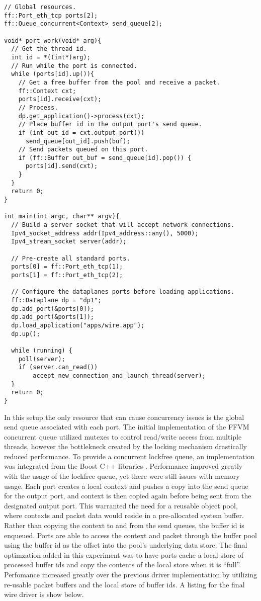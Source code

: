 \begin{lstlisting}
// Global resources.
ff::Port_eth_tcp ports[2];
ff::Queue_concurrent<Context> send_queue[2];

void* port_work(void* arg){
  // Get the thread id.
  int id = *((int*)arg);
  // Run while the port is connected.
  while (ports[id].up()){
    // Get a free buffer from the pool and receive a packet.
    ff::Context cxt;
    ports[id].receive(cxt);
    // Process.
    dp.get_application()->process(cxt);
    // Place buffer id in the output port's send queue.
    if (int out_id = cxt.output_port())
      send_queue[out_id].push(buf);
    // Send packets queued on this port.
    if (ff::Buffer out_buf = send_queue[id].pop()) {
      ports[id].send(cxt);
    }
  }
  return 0;
}

int main(int argc, char** argv){
  // Build a server socket that will accept network connections.
  Ipv4_socket_address addr(Ipv4_address::any(), 5000);
  Ipv4_stream_socket server(addr);

  // Pre-create all standard ports.
  ports[0] = ff::Port_eth_tcp(1);
  ports[1] = ff::Port_eth_tcp(2);

  // Configure the dataplanes ports before loading applications.
  ff::Dataplane dp = "dp1";
  dp.add_port(&ports[0]);
  dp.add_port(&ports[1]);
  dp.load_application("apps/wire.app");
  dp.up();

  while (running) {
  	poll(server);
  	if (server.can_read())
  		accept_new_connection_and_launch_thread(server);
  }
  return 0;
}
\end{lstlisting}

In this setup the only resource that can cause concurrency issues is the global
send queue associated with each port. The initial implementation of the FFVM
concurrent queue utilized mutexes to control read/write access from multiple
threads, however the bottlekneck created by the locking mechanism drastically
reduced performance. To provide a concurrent lockfree queue, an implementation
was integrated from the Boost C++ libraries \cite{boost}. Performance improved
greatly with the usage of the lockfree queue, yet there were still issues with
memory usage. Each port creates a local context and pushes a copy into the
send queue for the output port, and context is then copied again before being
sent from the designated output port. This warranted the need for a reusable
object pool, where contexts and packet data would reside in a pre-allocated
system buffer. Rather than copying the context to and from the send queues, the
buffer id is enqueued. Ports are able to access the context and packet through
the buffer pool using the buffer id as the offset into the pool's underlying
data store. The final optimzation added in this experiment was to have ports
cache a local store of processed buffer ids and copy the contents of the local
store when it is ``full''. Perfomance increased greatly over the previous driver
implementation by utilizing re-usable packet buffers and the local store of
buffer ids. A listing for the final wire driver is show below.

